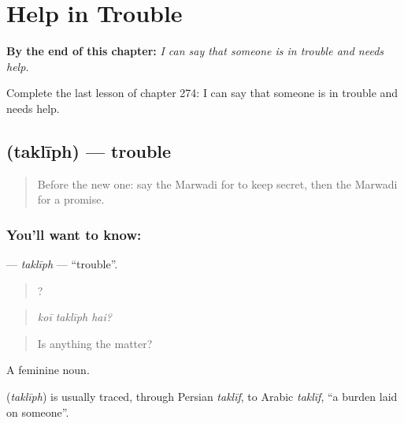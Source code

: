 
\chapter{Help in Trouble}
\label{ch:mw-help-in-trouble}

\begin{chapteropening}
\textbf{By the end of this chapter:} \emph{I can say that someone is in trouble and needs help.}

Complete the last lesson of chapter 274: I can say that someone is in trouble and needs help.
\end{chapteropening}

\section[\texorpdfstring{\mw{तकलीफ} (taklīph)}{तकलीफ (taklīph)}]{ (taklīph) — trouble}

\label{lesson:MW-C274-takliph}



\begin{quote}
Before the new one: say the Marwadi for to keep secret, then the Marwadi for a promise.
\end{quote}

\subsection*{You'll want to know: }
\textbf{} — \emph{taklīph} — \textquotedblleft{}trouble\textquotedblright{}.

\begin{quote}
  ?
\end{quote}

\begin{quote}
\emph{koī taklīph hai?}
\end{quote}

\begin{quote}
Is anything the matter?
\end{quote}

A feminine noun.

\begin{cousinweb}
\textbf{} (\emph{taklīph}) is usually traced, through Persian \emph{taklīf}, to Arabic \emph{taklīf}, \textquotedblleft{}a burden laid on someone\textquotedblright{}.
\end{cousinweb}

